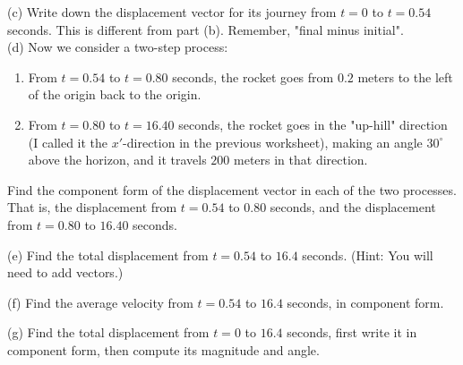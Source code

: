 \documentclass[11pt]{article}
\begin{document}
\noindent(c) Write down the displacement vector for its journey from $t=0$ to $t=0.54$ seconds. This is different from part (b). Remember, "final minus initial".\\

\newpage
\noindent(d) Now we consider a two-step process:
\begin{enumerate}
\item From $t=0.54$ to $t=0.80$ seconds, the rocket goes from $0.2$ meters to the left of the origin back to the origin. 
\item From $t = 0.80$ to $t = 16.40$ seconds, the rocket goes in the "up-hill" direction (I called it the $x'$-direction in the previous worksheet), making an angle $30^\circ$ above the horizon, and it travels $200$ meters in that direction. 
\end{enumerate}
Find the component form of the displacement vector in each of the two processes. That is, the displacement from $t=0.54$ to $0.80$ seconds, and the displacement from $t=0.80$ to $16.40$ seconds.\\
\hfill\newline\hfill\newline\hfill\newline
\hfill\newline\hfill

\noindent(e) Find the total displacement from $t=0.54$ to $16.4$ seconds. (Hint: You will need to add vectors.)\\
\hfill\newline\hfill\newline\hfill\newline
\hfill\newline\hfill

\noindent(f) Find the average velocity from $t = 0.54$ to $16.4$ seconds, in component form.\\
\hfill\newline\hfill\newline\hfill\newline
\hfill\newline\hfill

\noindent(g) Find the total displacement from $t=0$ to $16.4$ seconds, first write it in component form, then compute its magnitude and angle. \\
\hfill\newline\hfill\newline\hfill\newline
\hfill\newline\hfill
\end{document}
